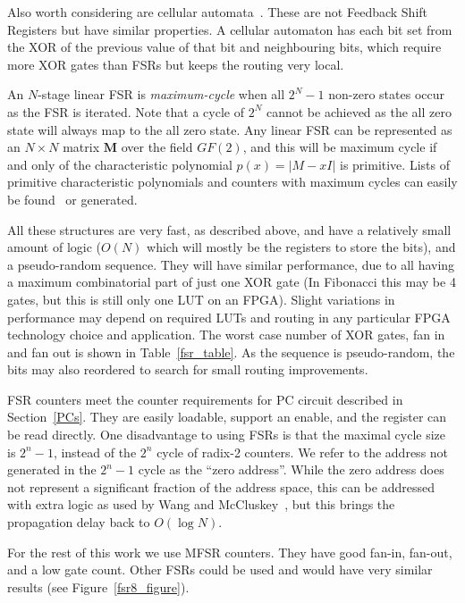 \documentclass[5p, twocolumn]{elsarticle}
\begin{document}
Also worth considering are cellular automata~\cite{cellular_automata}. These are
not Feedback Shift Registers but have similar properties. A cellular automaton
has each bit set from the XOR of the previous value of that bit and neighbouring
bits, which require more XOR gates than FSRs but keeps the routing very local.

An $N$-stage linear FSR is {\em maximum-cycle} when all  $2^N\!-\!1$ non-zero
states occur as the FSR is iterated. Note that a cycle of $2^N$ cannot be
achieved as the all zero state will always map to the all zero state. Any linear
FSR can be represented as an $N\times N$ matrix $\mathbf{M}$ over the field
$GF(2)$, and this will be maximum cycle if and only of the characteristic
polynomial $p(x)=|M-xI|$ is primitive. Lists of primitive characteristic
polynomials and counters with maximum cycles can easily be
found~\cite{menezes1997ac,xilinx052,ward_mfsr_table09} or generated.

All these structures are very fast, as described above, and have a relatively
small amount of logic ($O(N)$ which will mostly be the registers to store the
bits), and a pseudo-random sequence. They will have similar performance, due to
all having a maximum combinatorial part of just one XOR gate (In Fibonacci this
may be 4 gates, but this is still only one LUT on an FPGA). Slight variations in
performance may depend on required LUTs and routing in any particular FPGA
technology choice and application. The worst case number of XOR gates, fan in and
fan out is shown in Table~\ref{fsr_table}. As the sequence is pseudo-random, the
bits may also reordered to search for small routing improvements.

FSR counters meet the counter requirements for PC circuit described in
Section~\ref{PCs}. They are easily loadable, support an enable, and the register
can be read directly. One disadvantage to using FSRs is that the maximal cycle
size is $2^n-1$, instead of the $2^n$ cycle of radix-2 counters. We refer to the
address not generated in the $2^n-1$ cycle as the ``zero address''. While the
zero address does not represent a significant fraction of the address space, this
can be addressed with extra logic as used by Wang and
McCluskey~\cite{wang1988hdg}, but this brings the propagation delay back to
$O(\log N)$.

For the rest of this work we use MFSR counters. They have good fan-in, fan-out,
and a low gate count. Other FSRs could be used and would have very similar
results (see Figure~\ref{fsr8_figure}).
\end{document}
